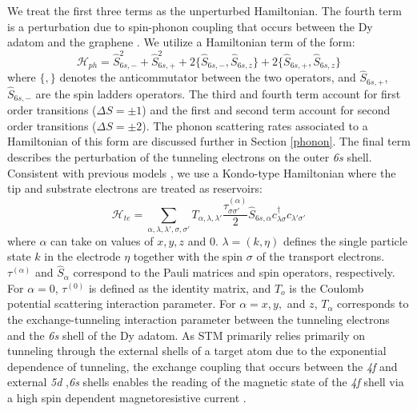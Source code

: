 \documentclass[reprint,amsmath,amssymb,aps,nofootinbib,onecolumn]{revtex4-2}
\begin{document}
We treat the first three terms as the unperturbed Hamiltonian. The fourth term is a perturbation due to spin-phonon coupling that occurs between the Dy adatom and the graphene \cite{Leuenberger2000,cervetti2016}. We utilize a Hamiltonian term of the form:
\begin{equation}
\mathcal{H}_{ph} = \hat{S}^{2}_{6s,-} + \hat{S}^{2}_{6s,+ } + 2 \{\hat{S}_{6s,-},\hat{S}_{6s,z}\} + 2 \{\hat{S}_{6s,+},\hat{S}_{6s,z}\}
\label{eq:ph}
\end{equation}
where $\{ ,\}$ denotes the anticommutator between the two operators, and $\hat{S}_{6s,+}$, $\hat{S}_{6s,-}$ are the spin ladders operators. The third and fourth term account for first order transitions ($\Delta S = \pm 1$) and the first and second term account for second order transitions ($\Delta S = \pm 2$). The phonon scattering rates associated to a Hamiltonian of this form are discussed further in Section \ref{phonon}. The final term describes the perturbation of the tunneling electrons on the outer \textit{6s} shell. Consistent with previous models \cite{anderson1966,schrieffer1966,appelbaum1967,delgado2010,loth2010,Ternes2015}, we use a Kondo-type Hamiltonian where the tip and substrate electrons are treated as reservoirs:  
\begin{equation}
\mathcal{H}_{te} = \sum_{\alpha,\lambda, \lambda',\sigma,\sigma'} T_{\alpha,\lambda, \lambda'} \frac{\tau^{(\alpha)}_{\sigma\sigma'}}{2} \hat{S}_{6s,\alpha} c^{\dagger}_{\lambda\sigma} c_{\lambda'\sigma'}
\end{equation}
where $\alpha$ can take on values of $x, y, z$ and $0$. $\lambda = (k,\eta)$ defines the single particle state $k$ in the electrode $\eta$ together with the spin $\sigma$ of the transport electrons. $\tau^{(\alpha)}$ and $\hat{S}_{\alpha}$ correspond to the Pauli matrices and spin operators, respectively. For $\alpha = 0$, $\tau^{(0)}$ is defined as the identity matrix, and $T_{o}$ is the Coulomb potential scattering interaction parameter. For $\alpha = x, y,$ and $z$, $T_{\alpha}$ corresponds to the exchange-tunneling interaction parameter between the tunneling electrons and the \textit{6s} shell of the Dy adatom. As STM primarily relies primarily on tunneling through the external shells of a target atom due to the exponential dependence of tunneling, the exchange coupling that occurs between the \textit{4f} and external \textit{5d} ,\textit{6s} shells enables the reading of the magnetic state of the \textit{4f} shell via a high spin dependent magnetoresistive current \cite{pivettaMeasuringIntraAtomicExchange2020}. \par
\end{document}
